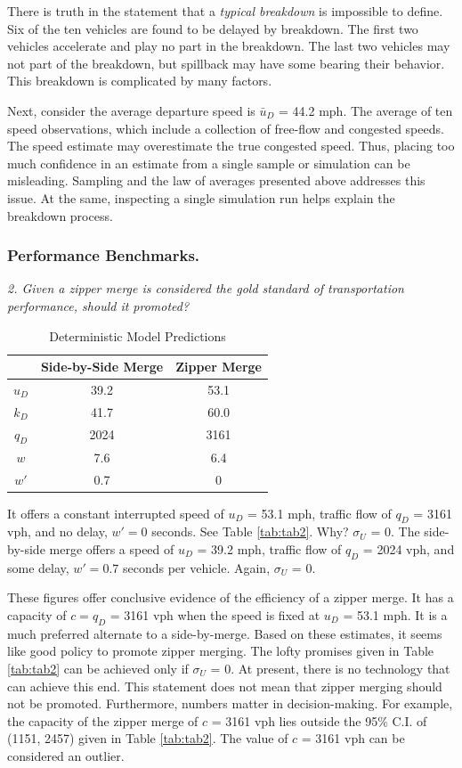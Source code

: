 \documentclass[Proceedings]{ascelike}
\begin{document}
There is truth in the statement that a \emph{typical breakdown} is impossible to define. Six of the ten vehicles are found to be delayed by breakdown. The first two vehicles  accelerate and play no part in the breakdown. The last two vehicles may not part of the breakdown, but spillback may have some bearing their behavior. This breakdown is complicated by many factors. 

Next, consider the  average departure speed is $\bar{u}_D$ = 44.2 mph. The average of ten speed observations, which include a collection of free-flow and congested speeds. The speed estimate may overestimate the true congested speed. Thus, placing too much confidence in an estimate from a single sample or simulation can be misleading.  Sampling and the law of averages  presented above addresses this issue. At the same, inspecting a single simulation run helps explain the breakdown process.

\subsubsection{Performance Benchmarks.}

\noindent \emph{2. Given a zipper merge is considered the gold standard of transportation performance, should it promoted?}


\begin{table}
\caption{Deterministic Model Predictions}
\centering
\small
\begin{tabular}{|c|c|c|}
\hline
\hline
&Side-by-Side Merge&Zipper Merge\\
\hline
 $u_D$  & 39.2 & 53.1 \\
 $k_D$  & 41.7& 60.0 \\
 $q_D$  & 2024&  3161 \\
 \hline
$w$     & 7.6 &   6.4 \\
$w'$    & 0.7 &  0  \\
 \hline
\hline
\end{tabular}
\label{tab:tab1}
\normalsize
\end{table}

It offers a constant interrupted speed of $u_D$ = 53.1 mph,  traffic flow of $q_D$ = 3161 vph, and no delay, $w' = 0$ seconds. See Table \ref{tab:tab2}. Why? $\sigma_U$ = 0. The side-by-side merge offers a speed of $u_D$ = 39.2 mph, traffic flow of  $q_D$ = 2024 vph, and some delay, $w' = 0.7$ seconds per vehicle. Again, $\sigma_U$ = 0.  

These figures offer conclusive evidence of the efficiency of a zipper merge. It has a capacity of $c = q_D$ = 3161 vph when the speed is fixed at $u_D$ = 53.1 mph. It is a much preferred alternate to a side-by-merge.  Based on these estimates, it seems like good policy to promote zipper merging.  The lofty promises given in Table \ref{tab:tab2} can be achieved only if  $\sigma_U$ = 0. At present, there is no technology that can achieve this end.    This statement does not mean that zipper merging should not be promoted. Furthermore, numbers matter in decision-making. For example, the capacity of the zipper merge  of $c$ = 3161 vph lies outside the 95$\%$ C.I. of (1151, 2457) given in Table \ref{tab:tab2}. The value of $c$ = 3161 vph can be considered an outlier.
\end{document}
